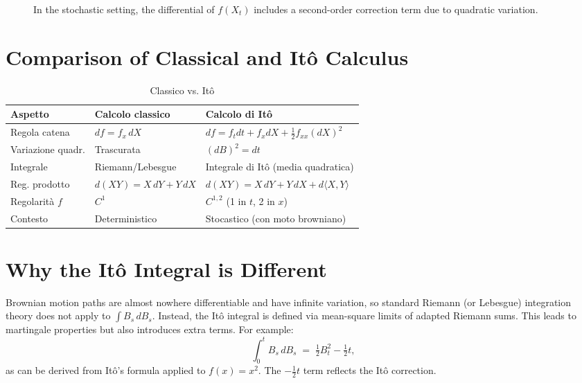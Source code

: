 \begin{figure}[ht]
\centering
{}
\caption{In the stochastic setting, the differential of $f(X_t)$ includes a second-order correction term due to quadratic variation.}
\end{figure}

\section{Comparison of Classical and It\^o Calculus}
\begin{table}[ht]
\centering
\small
\caption{Classico vs. It\^o}
\begin{tabular}{p{3.2cm}p{4.1cm}p{4.1cm}}
\hline
\textbf{Aspetto} & \textbf{Calcolo classico} & \textbf{Calcolo di It\^o} \\
\hline
Regola catena & $df = f_x\,dX$ & $df = f_t dt + f_x dX + \frac12 f_{xx} (dX)^2$ \\
Variazione quadr. & Trascurata & $(dB)^2 = dt$ \\
Integrale & Riemann/Lebesgue & Integrale di It\^o (media quadratica) \\
Reg. prodotto & $d(XY) = X\,dY + Y\,dX$ & $d(XY) = X\,dY + Y\,dX + d\langle X,Y\rangle$ \\
Regolarità $f$ & $C^1$ & $C^{1,2}$ (1 in $t$, 2 in $x$) \\
Contesto & Deterministico & Stocastico (con moto browniano) \\
\hline
\end{tabular}
\end{table}

\section{Why the It\^o Integral is Different}
Brownian motion paths are almost nowhere differentiable and have infinite variation, so standard Riemann (or Lebesgue) integration theory does not apply to $\int B_s\,dB_s$. Instead, the It\^o integral is defined via mean-square limits of adapted Riemann sums. This leads to martingale properties but also introduces extra terms. For example:
\[
  \int_0^t B_s\,dB_s \;=\; \tfrac12B_t^2 - \tfrac12 t,
\]
as can be derived from It\^o's formula applied to $f(x)=x^2$. The $-\tfrac12 t$ term reflects the It\^o correction.